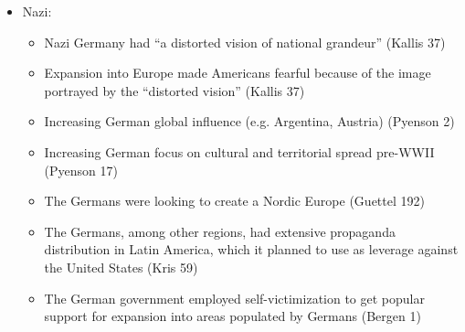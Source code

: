 \documentclass[a4paper,12pt]{article}
\begin{document}
\begin{itemize}
\begin{itemize}
\begin{itemize}
                \end{itemize}
                \item Nazi:
                \begin{itemize}
                    \item Nazi Germany had ``a distorted vision of national grandeur'' (Kallis 37)
                    \item Expansion into Europe made Americans fearful because of the image portrayed by the ``distorted vision'' (Kallis 37)
                    \item Increasing German global influence (e.g. Argentina, Austria) (Pyenson 2)
                    \item Increasing German focus on cultural and territorial spread pre-WWII (Pyenson 17)
                    \item The Germans were looking to create a Nordic Europe (Guettel 192)
                    \item The Germans, among other regions, had extensive propaganda distribution in Latin America, which it planned to use as leverage against the United States (Kris 59)
                    \item The German government employed self-victimization to get popular support for expansion into areas populated by Germans (Bergen 1)
                \end{itemize}
            \end{itemize}
        \end{itemize}
\end{document}
